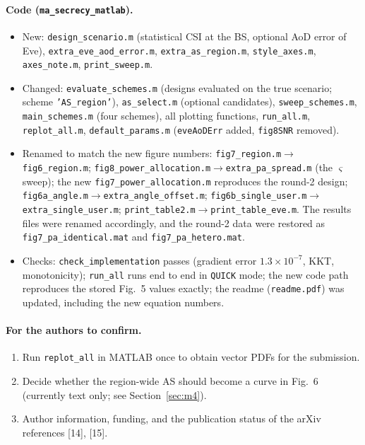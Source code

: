 \documentclass[10pt,a4paper]{article}
\newcommand{\code}[1]{\texttt{#1}}
\begin{document}
\paragraph{Code (\code{ma\_secrecy\_matlab}).}
\begin{itemize}
\item New: \code{design\_scenario.m} (statistical CSI at the BS, optional AoD error of Eve), \code{extra\_eve\_aod\_error.m}, \code{extra\_as\_region.m}, \code{style\_axes.m}, \code{axes\_note.m}, \code{print\_sweep.m}.
\item Changed: \code{evaluate\_schemes.m} (designs evaluated on the true scenario; scheme \code{'AS\_region'}), \code{as\_select.m} (optional candidates), \code{sweep\_schemes.m}, \code{main\_schemes.m} (four schemes), all plotting functions, \code{run\_all.m}, \code{replot\_all.m}, \code{default\_params.m} (\code{eveAoDErr} added, \code{fig8SNR} removed).
\item Renamed to match the new figure numbers: \code{fig7\_region.m}$\to$\code{fig6\_region.m}; \code{fig8\_power\_allocation.m}$\to$\code{extra\_pa\_spread.m} (the $\varsigma$ sweep); the new \code{fig7\_power\_allocation.m} reproduces the round-2 design; \code{fig6a\_angle.m}$\to$\code{extra\_angle\_offset.m}; \code{fig6b\_single\_user.m}$\to$\code{extra\_single\_user.m}; \code{print\_table2.m}$\to$\code{print\_table\_eve.m}. The results files were renamed accordingly, and the round-2 data were restored as \code{fig7\_pa\_identical.mat} and \code{fig7\_pa\_hetero.mat}.
\item Checks: \code{check\_implementation} passes (gradient error $1.3\times10^{-7}$, KKT, monotonicity); \code{run\_all} runs end to end in \code{QUICK} mode; the new code path reproduces the stored Fig.~5 values exactly; the readme (\code{readme.pdf}) was updated, including the new equation numbers.
\end{itemize}

\paragraph{For the authors to confirm.}
\begin{enumerate}
\item Run \code{replot\_all} in MATLAB once to obtain vector PDFs for the submission.
\item Decide whether the region-wide AS should become a curve in Fig.~6 (currently text only; see Section~\ref{sec:m4}).
\item Author information, funding, and the publication status of the arXiv references [14], [15].
\end{enumerate}
\end{document}
